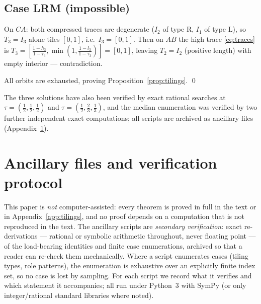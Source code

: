 \documentclass[11pt,reqno]{amsart}
\theoremstyle{plain}
\theoremstyle{definition}
\theoremstyle{remark}
\begin{document}
\subsection*{Case LRM \textup(impossible\textup)}
On $CA$: both compressed traces are degenerate ($I_2$ of type $\mathrm R$,
$I_1$ of type $\mathrm L$), so $T_3=I_3$ alone tiles $[0,1]$, i.e.\
$I_3=[0,1]$. Then on $AB$ the high trace \eqref{eq:traces} is
$T_3=[\tfrac{1-h_3}{1-\tau_3},\min(1,\tfrac{1-l_3}{1-\tau_3})]=[0,1]$, leaving
$T_2=I_2$ (positive length) with empty interior --- contradiction.

\medskip
All orbits are exhausted, proving Proposition~\ref{prop:tilings}. \qed

\medskip
The three solutions have also been verified by exact rational searches at
$\tau=(\tfrac12,\tfrac12,\tfrac12)$ and $\tau=(\tfrac12,\tfrac23,\tfrac13)$,
and the median enumeration was verified by two further independent exact
computations; all scripts are archived as ancillary files
(Appendix~\ref{app:ancillary}).

\section{Ancillary files and verification protocol}\label{app:ancillary}

This paper is \emph{not} computer-assisted: every theorem is proved in full
in the text or in Appendix~\ref{app:tilings}, and no proof depends on a
computation that is not reproduced in the text. The ancillary scripts are
\emph{secondary verification}: exact re-derivations --- rational or symbolic
arithmetic throughout, never floating point --- of the load-bearing
identities and finite case enumerations, archived so that a reader can
re-check them mechanically. Where a script enumerates cases (tiling types,
role patterns), the enumeration is exhaustive over an explicitly finite index
set, so no case is lost by sampling. For each script we record what it
verifies and which statement it accompanies; all run under Python~3 with
SymPy (or only integer/rational standard libraries where noted).
\end{document}
